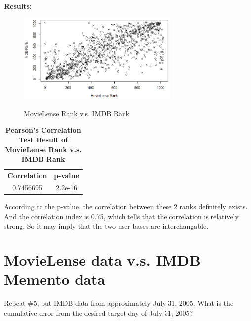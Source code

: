\documentclass{article}
\begin{document}
		\noindent\\\textbf{Results:}
		\begin{figure}[!htb]
			\centering 
			\href{https://github.com/zhangboroy/cs532-s17/blob/master/assg07_submission/Q5.png}
			{\includegraphics[width=0.7\textwidth]{Q5.png}}
			\label{fig:MovieLense Rank v.s. IMDB Rank}
			\caption{MovieLense Rank v.s. IMDB Rank}
		\end{figure}
		\begin{table}[!htb]
			\centering
			\caption{\textbf{Pearson's Correlation Test Result of MovieLense Rank v.s. IMDB Rank}}
			\begin{tabular}{cc}
				\toprule
				\textbf{Correlation} & \textbf{p-value}\\
				0.7456695 & 2.2e-16\\
				\bottomrule
			\end{tabular}
		\end{table}

		According to the p-value, the correlation between these 2 ranks definitely exists. And the correlation index is 0.75, which tells that the correlation is relatively strong. So it may imply that the two user bases are interchangable.\\
		\section{MovieLense data v.s. IMDB Memento data}
		Repeat \#5, but IMDB data from approximately July 31, 2005. What is the cumulative error from the desired target day of July 31, 2005?\\
\end{document}
